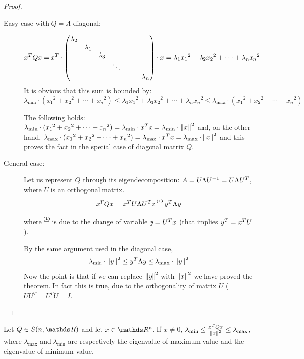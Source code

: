 \documentclass[computational_mathematics.tex]{subfiles}
\begin{document}
\begin{proof}
  \begin{description}
    \item[{\sc Easy case with $Q = \Lambda$ diagonal:}]
    
      $${x}^{T}Qx = {x}^{T} \cdot \begin{pmatrix}
    \lambda_2\\
    &\lambda_1\\
    &&\lambda_3\\
    &&& \ddots\\
    &&&&&&\lambda_n\\
    \end{pmatrix}
      \cdot x = \lambda_1 {x_1}^2 + \lambda_2 {x_2}^2 + \cdots + \lambda_n {x_n}^2$$
  It is obvious that this sum is bounded by:
  \[
    \lambda_{\text{min}} \cdot ({x_1}^2 +{x_2}^2 + \cdots + {x_n}^2) \le  \lambda_1 {x_1}^2 + \lambda_2 {x_2}^2 + \cdots + \lambda_n {x_n}^2 \le \lambda_{\text{max}} \cdot ({x_1}^2 +{x_2}^2 + \cdots + {x_n}^2)
  \]

      The following holds: $ \lambda_{\text{min}} \cdot ({x_1}^2 +{x_2}^2 + \cdots + {x_n}^2) =  \lambda_{\text{min}} \cdot {x}^{T} x =  \lambda_{\text{min}} \cdot {\left\lVert x\right\rVert}^2$ and, on the other hand, $ \lambda_{\text{max}} \cdot ({x_1}^2 +{x_2}^2 + \cdots + {x_n}^2) =  \lambda_{\text{max}} \cdot {x}^{T} x =  \lambda_{\text{max}} \cdot {\left\lVert x\right\rVert}^2$ and this proves the fact in the special case of diagonal matrix $Q$.
    \item[{\sc General case:}]
      Let us represent $Q$ through its eigendecomposition: $A = U \Lambda {U}^{-1} = U \Lambda {U}^{T}$, where $U$ is an orthogonal matrix.
      $$\tr{x}Qx = \tr{x} U \Lambda \tr{U} x \numeq{(1)} \tr{y} \Lambda y$$

      where $\numeq{(1)}$ is due to the change of variable $y = {U}^{T} x$ (that implies ${y}^{T} = {x}^{T} U$).

      By the same argument used in the diagonal case,
      $$\lambda_{\text{min}} \cdot {\left\lVert y\right\rVert}^2 \le {y}^{T} \Lambda y \le \lambda_{\text{max}} \cdot {\left\lVert y\right\rVert}^2$$
      Now the point is that if we can replace ${\left\lVert y\right\rVert}^2$ with ${\left\lVert x\right\rVert}^2$ we have proved the theorem.
      In fact this is true, due to the orthogonality of matrix $U$ ( $UU^T = U^TU = I$.
  \end{description}
\end{proof}

\begin{corollary}
  Let $Q \in S(n, \R)$ and let $x \in \R^n$. If $x \neq 0$, $\lambda_{\text{min}} \le \frac{{x}^{T}Qx}{{\left\lVert x\right\rVert}^2} \le \lambda_{\text{max}}$, where $\lambda_{\text{max}}$ and $\lambda_{\text{min}}$ are respectively the eigenvalue of maximum value and the eigenvalue of minimum value.
\end{corollary}
\end{document}
